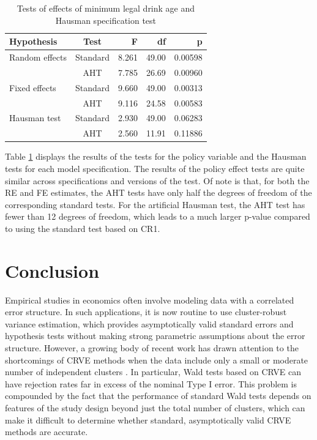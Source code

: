 \documentclass[12pt]{article}\usepackage[]{graphicx}\usepackage[]{color}
\begin{document}
\begin{table}[bth]
\centering
\caption{Tests of effects of minimum legal drink age and Hausman specification test} 
\label{tab:MLDA}
\begin{tabular}{lcrrr}
  \toprule
Hypothesis & Test & F & df & p \\ 
  \midrule
Random effects & Standard & 8.261 & 49.00 & 0.00598 \\ 
   & AHT & 7.785 & 26.69 & 0.00960 \\ 
  Fixed effects & Standard & 9.660 & 49.00 & 0.00313 \\ 
   & AHT & 9.116 & 24.58 & 0.00583 \\ 
   \midrule
Hausman test & Standard & 2.930 & 49.00 & 0.06283 \\ 
   & AHT & 2.560 & 11.91 & 0.11886 \\ 
   \bottomrule
\end{tabular}
\end{table}


Table \ref{tab:MLDA} displays the results of the tests for the policy variable and the Hausman tests for each model specification. 
The results of the policy effect tests are quite similar across specifications and versions of the test. 
Of note is that, for both the RE and FE estimates, the AHT tests have only half the degrees of freedom of the corresponding standard tests. 
For the artificial Hausman test, the AHT test has fewer than 12 degrees of freedom, which leads to a much larger p-value compared to using the standard test based on CR1. 

\section{Conclusion}
\label{sec:conclusion}

Empirical studies in economics often involve modeling data with a correlated error structure. 
In such applications, it is now routine to use cluster-robust variance estimation, which provides asymptotically valid standard errors and hypothesis tests without making strong parametric assumptions about the error structure. 
However, a growing body of recent work has drawn attention to the shortcomings of CRVE methods when the data include only a small or moderate number of independent clusters \citep{Cameron2008bootstrap, Cameron2015practitioners, Imbens2015robust, MacKinnon2016wild}. 
In particular, Wald tests based on CRVE can have rejection rates far in excess of the nominal Type I error. 
This problem is compounded by the fact that the performance of standard Wald tests depends on features of the study design beyond just the total number of clusters, which can make it difficult to determine whether standard, asymptotically valid CRVE methods are accurate. 
\end{document}
